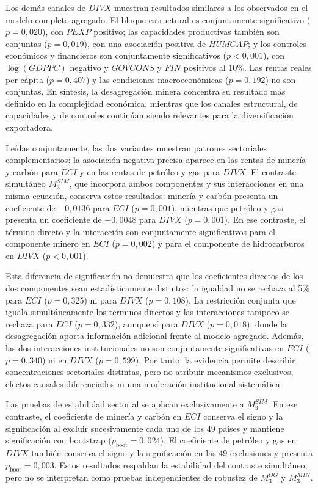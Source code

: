 \documentclass[../../TFM.tex]{subfiles}
\begin{document}
Los demás canales de $DIVX$ muestran resultados similares a los observados en
el modelo completo agregado. El bloque estructural es conjuntamente
significativo ($p=0,020$), con $PEXP$ positivo; las capacidades productivas
también son conjuntas ($p=0,019$), con una asociación positiva de $HUMCAP$; y
los controles económicos y financieros son conjuntamente significativos
($p<0,001$), con $\log(GDPPC)$ negativo y $GOVCONS$ y $FIN$ positivos al 10\%.
Las rentas reales per cápita ($p=0,407$) y las condiciones macroeconómicas
($p=0,192$) no son conjuntas. En síntesis, la desagregación minera concentra su
resultado más definido en la complejidad económica, mientras que los canales
estructural, de capacidades y de controles continúan siendo relevantes para la
diversificación exportadora.

Leídas conjuntamente, las dos variantes muestran patrones sectoriales
complementarios: la asociación negativa precisa aparece en las rentas de minería
y carbón para $ECI$ y en las rentas de petróleo y gas para $DIVX$. El contraste
simultáneo $M_{3}^{SIM}$, que incorpora ambos componentes y sus interacciones en
una misma ecuación, conserva estos resultados: minería y carbón presenta un
coeficiente de $-0,0136$ para $ECI$ ($p=0,001$), mientras que petróleo y gas
presenta un coeficiente de $-0,0048$ para $DIVX$ ($p=0,001$). En ese contraste,
el término directo y la interacción son conjuntamente significativos para el
componente minero en $ECI$ ($p=0,002$) y para el componente de hidrocarburos en
$DIVX$ ($p<0,001$).

Esta diferencia de significación no demuestra que los coeficientes directos de
los dos componentes sean estadísticamente distintos: la igualdad no se rechaza
al 5\% para $ECI$ ($p=0,325$) ni para $DIVX$ ($p=0,108$). La restricción conjunta
que iguala simultáneamente los términos directos y las interacciones tampoco se
rechaza para $ECI$ ($p=0,332$), aunque sí para $DIVX$ ($p=0,018$), donde la
desagregación aporta información adicional frente al modelo agregado. Además,
las dos interacciones institucionales no son conjuntamente significativas en
$ECI$ ($p=0,340$) ni en $DIVX$ ($p=0,599$). Por tanto, la evidencia permite
describir concentraciones sectoriales distintas, pero no atribuir mecanismos
exclusivos, efectos causales diferenciados ni una moderación institucional
sistemática.

Las pruebas de estabilidad sectorial se aplican exclusivamente a
$M_{3}^{SIM}$. En ese contraste, el coeficiente de minería y carbón en $ECI$
conserva el signo y la significación al excluir sucesivamente cada uno de los 49
países y mantiene significación con bootstrap
($p_{\mathrm{boot}}=0,024$). El coeficiente de petróleo y gas en $DIVX$ también
conserva el signo y la significación en las 49 exclusiones y presenta
$p_{\mathrm{boot}}=0,003$. Estos resultados respaldan la estabilidad del
contraste simultáneo, pero no se interpretan como pruebas independientes de
robustez de $M_{3}^{OG}$ y $M_{3}^{MIN}$.
\end{document}
